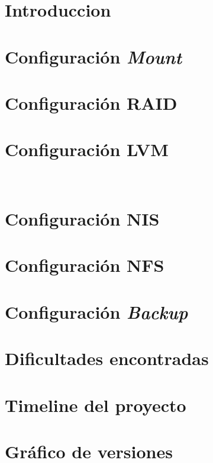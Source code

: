 \documentclass[12pt, spanish, a4paper, hidelinks]{article}
\begin{document}
    \maketitle
    
    \tableofcontents

    \newpage
    \section{Introduccion}
    

    \newpage
    \section{Configuración \textit{Mount}}
    

    \newpage
    \section{Configuración RAID}
    
    
    \newpage
    \section{Configuración LVM}
    
    
    \newpage 
    \section{Configuración NIS}
    
    
    \newpage
    \section{Configuración NFS}
    

    \newpage
    \section{Configuración \textit{Backup}}
    

    \newpage
    \section{Dificultades encontradas}
    

    \newpage
    \section{Timeline del proyecto}
    

    \newpage
    \section{Gráfico de versiones}
    
\end{document}
